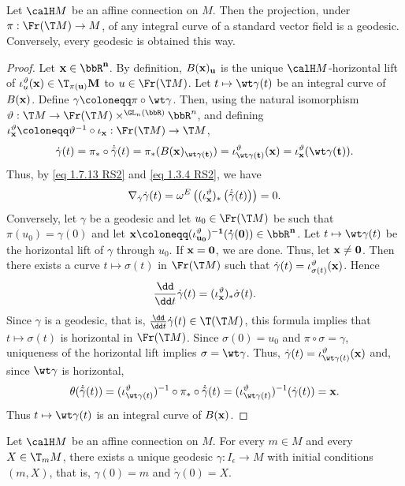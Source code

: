 \begin{prop}[{{\cite[Prop.~2.1.22]{RS2}}}]\label{prop 2.1.22 RS2}
    Let $\calH M$ be an affine connection on $M$. Then the projection, under $\pi:\Fr(\T M)\to M$, of any integral curve of a standard vector field is a geodesic. Conversely, every geodesic is obtained this way.
\end{prop}
\begin{proof}
    Let $\bf{x}\in\bbR^n$. By definition, $B(\bf{x})_u$ is the unique $\calH M$-horizontal lift of $\iota_u^\vartheta(\bf{x})\in \T_{\pi(u)}M$ to $u\in\Fr(\T M)$. Let $t\mapsto \wt\gamma(t)$ be an integral curve of $B(\bf{x})$. Define $\gamma\coloneqq \pi\circ\wt\gamma$. Then, using the natural isomorphism $\vartheta:\T M\to \Fr(\T M)\times^{\GL_n(\bbR)}\bbR^n$, and defining $\iota_{\bf{x}}^\vartheta\coloneqq \vartheta^{-1}\circ\iota_{\bf{x}}:\Fr(\T M)\to \T M$,
    \[\dot\gamma(t)=\pi_\ast\circ \dot{\tilde\gamma}(t)=\pi_\ast(B(\bf{x})_{\wt\gamma(t)})=\iota_{\wt\gamma(t)}^\vartheta(\bf{x})=\iota_{\bf{x}}^\vartheta(\wt\gamma(t)).\]
    Thus, by \eqref{eq 1.7.13 RS2} and \eqref{eq 1.3.4 RS2}, we have 
    \[\nabla_{\dot\gamma}\dot\gamma(t)=\omega^E\left((\iota_{\bf{x}}^\vartheta)_\ast \left(\dot{\tilde\gamma}(t)\right)\right)=0.\]
    Conversely, let $\gamma$ be a geodesic and let $u_0\in\Fr(\T M)$ be such that $\pi(u_0)=\gamma(0)$ and let $\bf{x}\coloneqq (\iota_{u_0}^\vartheta)^{-1}(\dot\gamma(0))\in\bbR^n$. Let $t\mapsto \wt\gamma(t)$ be the horizontal lift of $\gamma$ through $u_0$. If $\bf{x}=0$, we are done. Thus, let $\bf{x}\neq 0$. Then there exists a curve $t\mapsto \sigma(t)$ in $\Fr(\T M)$ such that $\dot\gamma(t)=\iota_{\sigma(t)}^\vartheta(\bf{x})$. Hence 
    \[\frac{\dd}{\dd t}\dot\gamma(t)=(\iota^\vartheta_{\bf{x}})_\ast\dot\sigma(t).\] 
    Since $\gamma$ is a geodesic, that is, $\frac{\dd}{\dd t}\dot\gamma(t)\in \T(\T M)$, this formula implies that $t\mapsto \sigma(t)$ is horizontal in $\Fr(\T M)$. Since $\sigma(0)=u_0$ and $\pi\circ \sigma=\gamma$, uniqueness of the horizontal lift implies $\sigma=\wt\gamma$. Thus, $\dot\gamma(t)=\iota_{\wt\gamma(t)}^\vartheta(\bf{x})$ and, since $\wt\gamma$ is horizontal,
    \[\theta(\dot{\tilde\gamma}(t))=(\iota_{\wt\gamma(t)}^\vartheta)^{-1}\circ\pi_\ast\circ\dot{\tilde\gamma}(t)=
    (\iota_{\wt\gamma(t)}^\vartheta)^{-1}(\dot\gamma(t))=\bf{x}.\]
    Thus $t\mapsto \wt\gamma(t)$ is an integral curve of $B(\bf{x})$.
\end{proof}

\begin{cor}[{{\cite[Cor.~2.1.23]{RS2}}}]\label{cor 2.1.23 RS2}
    Let $\calH M$ be an affine connection on $M$. For every $m\in M$ and every $X\in \T_mM$, there exists a unique geodesic $\gamma:I_\epsilon\to M$ with initial conditions $(m,X)$, that is, $\gamma(0)=m$ and $\dot\gamma(0)=X$.
\end{cor}

